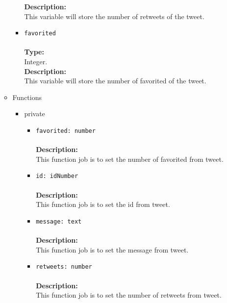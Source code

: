 \begin{itemize}
\begin{itemize}
\begin{itemize}
     \textbf{Description:}\\
     This variable will store the number of retweets of the tweet.\\
\item \verb~favorited~\\\\
\textbf{Type:}\\
     Integer.\\

     \textbf{Description:}\\
     This variable will store the number of favorited of the tweet.
\end{itemize}


\item Functions
\label{sec-1-4-2-2-2}%
\begin{itemize}

\item private
\label{sec-1-4-2-2-2-1}%
\begin{itemize}
\item \verb~favorited: number~\\\\
\textbf{Description:}\\
      This function job is to set the number of favorited from tweet.\\
\item \verb~id: idNumber~\\\\
\textbf{Description:}\\
      This function job is to set the id from tweet.\\
\item \verb~message: text~\\\\
\textbf{Description:}\\
      This function job is to set the message from tweet.\\
\item \verb~retweets: number~\\\\
\textbf{Description:}\\
      This function job is to set the number of retweets from tweet.
\end{itemize}



\end{itemize}
\end{itemize}
\end{itemize}
